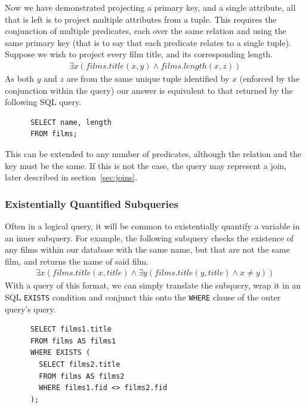 \documentclass[a4paper, 11pt]{article}
\begin{document}
      Now we have demonstrated projecting a primary key, and a single attribute,
      all that is left is to project multiple attributes from a tuple. This
      requires the conjunction of multiple predicates, each over the same relation
      and using the same primary key (that is to say that each predicate relates
      to a single tuple). Suppose we wish to project every film title, and its
      corresponding length.
      \begin{gather}
        \exists x(films.title(x, y) \land films.length(x, z))
      \end{gather}
      As both $y$ and $z$ are from the same unique tuple identified by $x$
      (enforced by the conjunction within the query) our
      answer is equivalent to that returned by the following SQL query.
      \begin{verbatim}
      SELECT name, length
      FROM films;
      \end{verbatim}
      This can be extended to any number of predicates, although the relation and
      the key must be the same. If this is not the case, the query may represent
      a join, later described in section~\ref{sec:joins}.

    \subsubsection{Existentially Quantified Subqueries}
      \label{sec:existential}
      Often in a logical query, it will be common to existentially quantify a
      variable in an inner subquery. For example, the following subquery checks
      the existence of any films within our database with the same name, but that
      are not the same film, and returns the name of said film.
      \begin{gather}
        \exists x(films.title(x, title) \land \exists y(films.title(y,
        title) \land x \neq y))
      \end{gather}
      With a query of this format, we can simply translate the subquery, wrap it
      in an SQL \texttt{EXISTS} condition and conjunct this onto the
      \texttt{WHERE} clause of the outer query's query.

      \begin{verbatim}
      SELECT films1.title
      FROM films AS films1
      WHERE EXISTS (
        SELECT films2.title
        FROM films AS films2
        WHERE films1.fid <> films2.fid
      );
      \end{verbatim}
\end{document}
